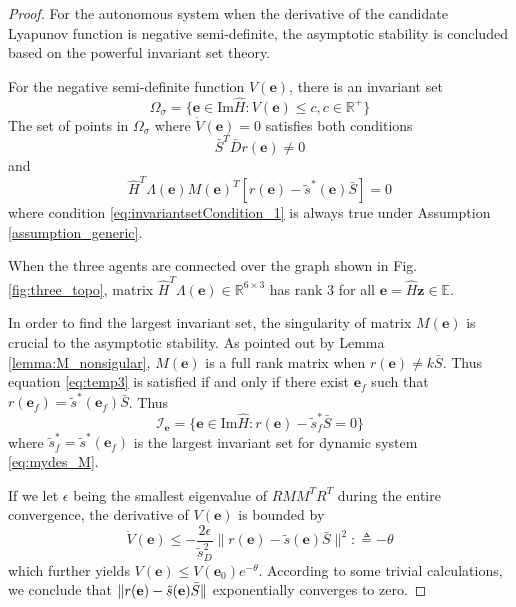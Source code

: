 \documentclass[times]{rncauth}
\newcommand{\be}{\ensuremath \mathbf{e}}
\begin{document}
\begin{proof}
For the autonomous system when the derivative of the candidate
Lyapunov function is negative semi-definite, the asymptotic
stability is concluded based on the powerful invariant set theory.

For the negative semi-definite function $V(\mathbf{e})$, there is an
invariant set
\begin{equation*}
  \Omega_\sigma=\{\mathbf{e}\in \text{Im}\hat{H}:V(\mathbf{e})\leq c,c\in\mathbb{R}^+\}
\end{equation*}
The set of points in $\Omega_\sigma$ where $\dot{V}(\mathbf{e})=0$
satisfies both conditions
\begin{equation}\label{eq:invariantsetCondition_1}
\bar{S}^T\bar{D}r(\mathbf{e})\neq 0
\end{equation}
and
\begin{equation}\label{eq:temp3}
  \hat{H}^T\Lambda(\mathbf{e})M(\mathbf{e})^T[r(\mathbf{e})-\tilde{s}^*(\mathbf{e})\bar{S}]=0
\end{equation}
where condition \eqref{eq:invariantsetCondition_1} is always true
under Assumption \ref{assumption_generic}.

When the three agents are connected over the graph shown in Fig.
\ref{fig:three_topo}, matrix $\hat{H}^T\Lambda(\mathbf{e})\in
\mathbb{R}^{6\times 3}$ has rank $3$ for all
$\mathbf{\mathbf{e}}=\hat{H}\mathbf{z}\in\mathbb{E}$.

In order to find the largest invariant set, the singularity of
matrix $M(\mathbf{e})$ is crucial to the asymptotic stability. As
pointed out by Lemma \ref{lemma:M_nonsigular}, $M(\mathbf{e})$ is a
full rank matrix when $r(\mathbf{e})\neq k\bar{S}$. Thus equation
\eqref{eq:temp3} is satisfied if and only if there exist
$\mathbf{e}_f$ such that
$r(\mathbf{e}_f)=\tilde{s}^*(\mathbf{e}_f)\bar{S}$. Thus
\begin{equation}\label{eq:invariantSet_2}
  \mathcal{I}_{\mathbf{e}}=\{\mathbf{e}\in\text{Im}\hat{H}:r(\mathbf{e})-\tilde{s}^*_f\bar{S}=0\}
\end{equation}
where $\tilde{s}^*_f=\tilde{s}^*(\mathbf{e}_f)$ is the largest
invariant set for dynamic system \eqref{eq:mydes_M}.





If we let $\epsilon$ being the smallest eigenvalue of $RMM^TR^T$
during the entire convergence, the derivative of $V(\mathbf{e})$ is
bounded by $$\dot{V}(\mathbf{e})\leq -
\frac{2\epsilon}{\tilde{s}_D^2}
\|r(\mathbf{e})-\tilde{s}(\mathbf{e})\bar{S}\|^2: \triangleq -\theta
$$
which further yields $V(\mathbf{e})\leq V(\mathbf{e}_0)
e^{-\theta}$. According to some trivial calculations, we conclude
that $\|r(\mathbf{e})-\tilde{s}(\be) \bar{S}\|$ exponentially
converges to zero.
\end{proof}
\renewcommand{\proofname}{PROOF}
\end{document}
